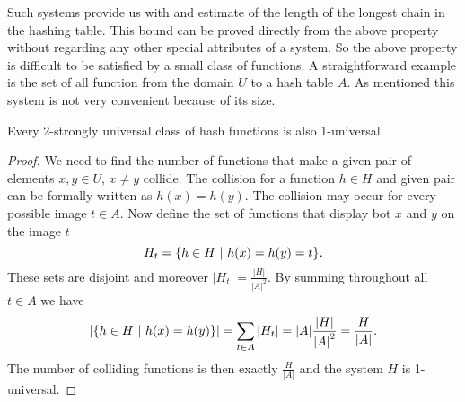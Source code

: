 Such systems provide us with and estimate of the length of the longest chain in the hashing table. This bound can be proved directly from the above property without regarding any other special attributes of a system. So the above property is difficult to be satisfied by a small class of functions. A straightforward example is the set of all function from the domain $U$ to a hash table $A$. As mentioned this system is not very convenient because of its size.

\begin{remark}
Every 2-strongly universal class of hash functions is also 1-universal.
\end{remark}
\begin{proof}
We need to find the number of functions that make a given pair of elements $x, y \in U$, $x \neq y$ collide. The collision for a function $h \in H$ and given pair can be formally written as $h(x) = h(y)$. The collision may occur for every possible image $t \in A$. Now define the set of functions that display bot $x$ and $y$ on the image $t$ \[ H_t = \lbrace h \in H \ | \  h(x) = h(y) = t \rbrace \textit{.} \] These sets are disjoint and moreover $|H_t| = \frac{|H|}{{|A|}^{2}}$. By summing throughout all $t \in A$ we have
\begin{displaymath}
|\lbrace h \in H \ | \  h(x) = h(y) \rbrace | = \displaystyle \sum_{t \in A} |H_t| = |A| \frac{|H|}{{|A|}^{2}} = \frac{H}{|A|}\textit{.}
\end{displaymath}
The number of colliding functions is then exactly $\frac{H}{|A|}$ and the system $H$ is 1-universal.
\end{proof}

